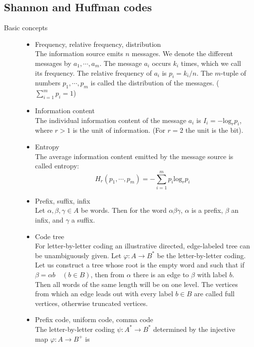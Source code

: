 \documentclass[margin=0px]{article}
\begin{document}
\subsection{Shannon and Huffman codes}
\begin{description}
    \item[Basic concepts] \hfill
        \begin{itemize}
            \item Frequency, relative frequency, distribution \\
                  The information source emits $n$ messages. We denote the different messages by $a_1, \cdots, a_m$. The message $a_i$ occurs $k_i$ times, which we call its frequency. The relative frequency of $a_i$ is $p_i = k_i/n$. The $m$-tuple of numbers $p_1,\cdots,p_m$ is called the distribution of the messages. ($\sum_{i=1}^{m}p_i = 1$)
            \item Information content \\
                  The individual information content of the message $a_i$ is $I_i = - \text{log}_rp_i$, where $r>1$ is the unit of information. (For $r=2$ the unit is the bit).
            \item Entropy \\
                  The average information content emitted by the message source is called entropy:
                  \[H_r(p_1, \cdots, p_m) = - \sum\limits_{i=1}^{m}p_i\text{log}_rp_i  \]
            \item Prefix, suffix, infix \\
                  Let $\alpha, \beta, \gamma \in A$ be words. Then for the word $\alpha\beta\gamma$, $\alpha$ is a prefix, $\beta$ an infix, and $\gamma$ a suffix.
            \item Code tree \\
                  For letter-by-letter coding an illustrative directed, edge-labeled tree can be unambiguously given. Let $\varphi : A \rightarrow B^*$ be the letter-by-letter coding. Let us construct a tree whose root is the empty word and such that if $\beta = \alpha b\quad (b\in B)$, then from $\alpha$ there is an edge to $\beta$ with label $b$. Then all words of the same length will be on one level. The vertices from which an edge leads out with every label $b\in B$ are called full vertices, otherwise truncated vertices.
            \item Prefix code, uniform code, comma code \\
                  The letter-by-letter coding $\psi : A^* \rightarrow B^*$ determined by the injective map $\varphi : A \rightarrow B^+$ is

\end{itemize}
\end{description}
\end{document}
